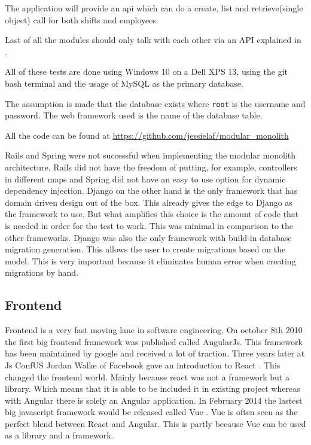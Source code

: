 The application will provide an api which can do a create, list and retrieve(single object) call for both shifts and employees.

Last of all the modules should only talk with each other via an API explained in .

All of these tests are done using Windows 10 on a Dell XPS 13, using the git bash terminal and the usage of MySQL as the primary database.

The assumption is made that the database exists where \texttt{root} is the username and password. The web framework used is the name of the database table.

All the code can be found at \url{https://github.com/jessielaf/modular_monolith}

Rails and Spring were not successful when implementing the modular monolith architecture. Rails did not have the freedom of putting, for example, controllers in different maps and Spring did not have an easy to use option for dynamic dependency injection. Django on the other hand is the only framework that has domain driven design out of the box. This already gives the edge to Django as the framework to use. But what amplifies this choice is the amount of code that is needed in order for the test to work. This was minimal in comparison to the other frameworks. Django was also the only framework with build-in database migration generation. This allows the user to create migrations based on the model. This is very important because it eliminates human error when creating migrations by hand.

\subsection{Frontend}
\label{sec:Frontend}

Frontend is a very fast moving lane in software engineering. On october 8th 2010 \cite{angularJs} the first big frontend framework was published called AngularJs. This framework has been maintained by google and received a lot of traction. Three years later at Js ConfUS Jordan Walke of Facebook gave an introduction to React \cite{reactJs}. This changed the frontend world. Mainly because react was not a framework but a library. Which means that it is able to be included it in existing project whereas with Angular there is solely an Angular application. In February 2014 the lastest big javascript framework would be released called Vue \cite{vueJs}. Vue is often seen as the perfect blend between React and Angular. This is partly because Vue can be used as a library and a framework.

